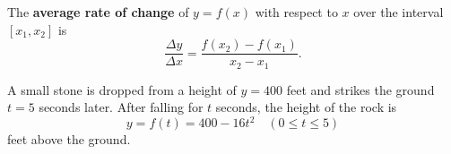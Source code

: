 \setcounter{chapter}{2}
\setcounter{section}{1}
\setcounter{theorem}{0}
\setcounter{equation}{0}


\begin{definition}
The \textbf{average rate of change} of $y=f(x)$ with respect to $x$ over the interval $[x_1,x_2]$ is
\begin{equation*}
\frac{\Delta y}{\Delta x} = \frac{f(x_2)-f(x_1)}{x_2-x_1}.
\end{equation*}
\end{definition}

\begin{example}
A small stone is dropped from a height of $y=400$ feet and strikes the ground $t=5$ seconds later.
After falling for $t$ seconds, the height of the rock is 
\begin{equation*}
y= f(t)=400-16t^2 \quad (0\le t\le 5)
\end{equation*}
feet above the ground.
\end{example}


